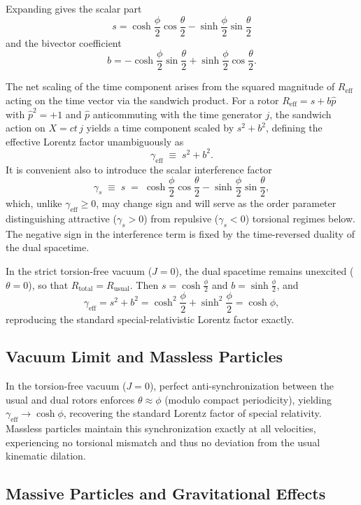 \documentclass[dvipdfmx,a4paper]{article}
\begin{document}
Expanding gives the scalar part
\[
s = \cosh\frac{\phi}{2} \cos\frac{\theta}{2} - \sinh\frac{\phi}{2} \sin\frac{\theta}{2}
\]
and the bivector coefficient
\[
b = -\cosh\frac{\phi}{2} \sin\frac{\theta}{2} + \sinh\frac{\phi}{2} \cos\frac{\theta}{2}.
\]

The net scaling of the time component arises from the squared magnitude of $R_\text{eff}$ acting on the time vector via the sandwich product. For a rotor $R_\text{eff} = s + b\hat{p}$ with $\hat{p}^2 = +1$ and $\hat{p}$ anticommuting with the time generator $j$, the sandwich action on $X = ct\, j$ yields a time component scaled by $s^2 + b^2$, defining the effective Lorentz factor unambiguously as
\[
\gamma_\text{eff} \;\equiv\; s^2 + b^2.
\]
It is convenient also to introduce the scalar interference factor
\[
\gamma_s \;\equiv\; s \;=\; \cosh\frac{\phi}{2} \cos\frac{\theta}{2} - \sinh\frac{\phi}{2} \sin\frac{\theta}{2},
\]
which, unlike $\gamma_\text{eff}\geq 0$, may change sign and will serve as the order parameter distinguishing attractive ($\gamma_s > 0$) from repulsive ($\gamma_s < 0$) torsional regimes below. The negative sign in the interference term is fixed by the time-reversed duality of the dual spacetime.

In the strict torsion-free vacuum ($J=0$), the dual spacetime remains unexcited ($\theta = 0$), so that $R_\text{total} = R_\text{usual}$. Then $s = \cosh\frac{\phi}{2}$ and $b = \sinh\frac{\phi}{2}$, and
\[
\gamma_\text{eff} = s^2 + b^2 = \cosh^2\frac{\phi}{2} + \sinh^2\frac{\phi}{2} = \cosh\phi,
\]
reproducing the standard special-relativistic Lorentz factor exactly.

\subsection{Vacuum Limit and Massless Particles}

In the torsion-free vacuum ($J=0$), perfect anti-synchronization between the usual and dual rotors enforces $\theta \approx \phi$ (modulo compact periodicity), yielding $\gamma_{\text{eff}} \to \cosh\phi$, recovering the standard Lorentz factor of special relativity. Massless particles maintain this synchronization exactly at all velocities, experiencing no torsional mismatch and thus no deviation from the usual kinematic dilation.

\subsection{Massive Particles and Gravitational Effects}
\end{document}
